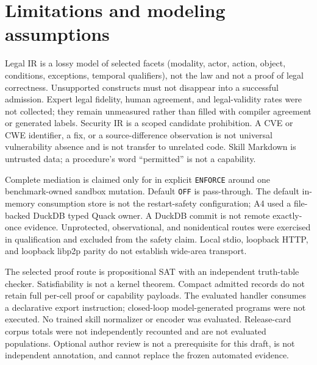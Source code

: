 \section{Limitations and modeling assumptions}
\label{sec:limits}

Legal IR is a lossy model of selected facets (modality, actor, action, object, conditions, exceptions, temporal qualifiers), not the law and not a proof of legal correctness. Unsupported constructs must not disappear into a successful admission. Expert legal fidelity, human agreement, and legal-validity rates were not collected; they remain unmeasured rather than filled with compiler agreement or generated labels. Security IR is a scoped candidate prohibition. A CVE or CWE identifier, a fix, or a source-difference observation is not universal vulnerability absence and is not transfer to unrelated code. Skill Markdown is untrusted data; a procedure's word ``permitted'' is not a capability.

Complete mediation is claimed only for  in explicit \texttt{ENFORCE} around one benchmark-owned  sandbox mutation. Default \texttt{OFF} is pass-through. The default in-memory consumption store is not the restart-safety configuration; A4 used a file-backed DuckDB typed Quack owner. A DuckDB commit is not remote exactly-once evidence. Unprotected, observational, and nonidentical routes were exercised in qualification and excluded from the safety claim. Local stdio, loopback HTTP, and loopback libp2p parity do not establish wide-area transport.

The selected proof route is propositional SAT with an independent truth-table checker. Satisfiability is not a kernel theorem. Compact admitted records do not retain full per-cell proof or capability payloads. The evaluated handler consumes a declarative export instruction; closed-loop model-generated programs were not executed. No trained skill normalizer or encoder was evaluated. Release-card corpus totals were not independently recounted and are not evaluated populations. Optional author review is not a prerequisite for this draft, is not independent annotation, and cannot replace the frozen automated evidence.
